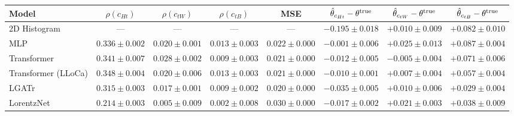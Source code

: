 \begin{tabular}{lccccccc}
\toprule
Model & $\rho(c_{Ht})$ & $\rho(c_{tW})$ & $\rho(c_{tB})$ & MSE & $\hat{\theta}_{c_{Ht}} - \theta^{\rm true}$ & $\hat{\theta}_{c_{tW}} - \theta^{\rm true}$ & $\hat{\theta}_{c_{tB}} - \theta^{\rm true}$ \\
\midrule
2D Histogram & — & — & — & — & $-0.195 \pm 0.018$ & $+0.010 \pm 0.009$ & $+0.082 \pm 0.010$ \\
MLP & $0.336 \pm 0.002$ & $0.020 \pm 0.001$ & $0.013 \pm 0.003$ & $0.022 \pm 0.000$ & $-0.001 \pm 0.006$ & $+0.025 \pm 0.013$ & $+0.087 \pm 0.004$ \\
Transformer & $0.341 \pm 0.007$ & $0.028 \pm 0.002$ & $0.009 \pm 0.003$ & $0.021 \pm 0.000$ & $-0.012 \pm 0.005$ & $-0.005 \pm 0.004$ & $+0.071 \pm 0.006$ \\
Transformer (LLoCa) & $0.348 \pm 0.004$ & $0.020 \pm 0.006$ & $0.013 \pm 0.003$ & $0.021 \pm 0.000$ & $-0.010 \pm 0.001$ & $+0.007 \pm 0.004$ & $+0.057 \pm 0.004$ \\
LGATr & $0.315 \pm 0.003$ & $0.017 \pm 0.001$ & $0.009 \pm 0.002$ & $0.020 \pm 0.000$ & $-0.035 \pm 0.005$ & $+0.010 \pm 0.006$ & $+0.029 \pm 0.004$ \\
LorentzNet & $0.214 \pm 0.003$ & $0.005 \pm 0.009$ & $0.002 \pm 0.008$ & $0.030 \pm 0.000$ & $-0.017 \pm 0.002$ & $+0.021 \pm 0.003$ & $+0.038 \pm 0.009$ \\
\bottomrule
\end{tabular}
